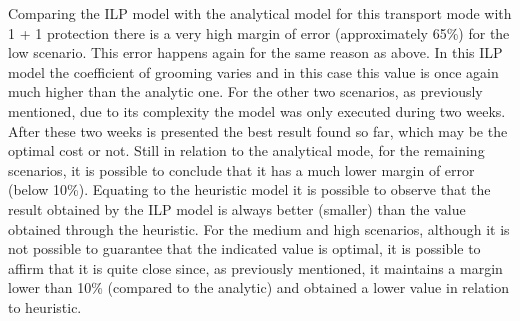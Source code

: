 \vspace{13pt}
Comparing the ILP model with the analytical model for this transport mode with 1 + 1 protection there is a very high margin of error (approximately 65\%) for the low scenario. This error happens again for the same reason as above. In this ILP model the coefficient of grooming varies and in this case this value is once again much higher than the analytic one.
For the other two scenarios, as previously mentioned, due to its complexity the model was only executed during two weeks. After these two weeks is presented the best result found so far, which may be the optimal cost or not.
Still in relation to the analytical mode, for the remaining scenarios, it is possible to conclude that it has a much lower margin of error (below 10\%).
Equating to the heuristic model it is possible to observe that the result obtained by the ILP model is always better (smaller) than the value obtained through the heuristic.
For the medium and high scenarios, although it is not possible to guarantee that the indicated value is optimal, it is possible to affirm that it is quite close since, as previously mentioned, it maintains a margin lower than 10\% (compared to the analytic) and obtained a lower value in relation to heuristic.
